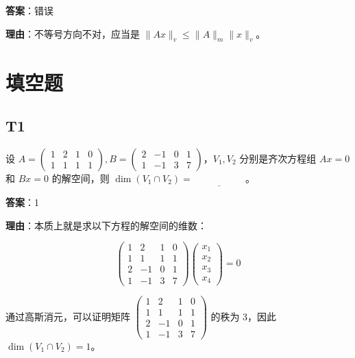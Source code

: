 \documentclass{article}
\begin{document}
\par \textbf{答案}：错误

\par \textbf{理由}：不等号方向不对，应当是 $\|Ax\|_v\leq \|A\|_m \|x\|_v$。

\section{填空题}

\subsection{T1}

\par 设 $A=\begin{pmatrix}
	1 & 2 & 1 & 0\\
	1 & 1 & 1 & 1
\end{pmatrix}, B = \begin{pmatrix}
	2 & -1 & 0 & 1\\
	1 & -1 & 3 & 7
\end{pmatrix}$，$V_1, V_2$ 分别是齐次方程组 $Ax=0$ 和 $Bx=0$ 的解空间，则 $\dim(V_1\cap V_2)=\underline{\phantom{empty\_space}}$。

\par \textbf{答案}：1

\par \textbf{理由}：本质上就是求以下方程的解空间的维数：

\begin{equation*}
	\begin{pmatrix}
		1 & 2 & 1 & 0\\
		1 & 1 & 1 & 1\\
		2 & -1 & 0 & 1\\
		1 & -1 & 3 & 7
	\end{pmatrix} \begin{pmatrix}
		x_1\\x_2\\x_3\\x_4
	\end{pmatrix}=0
\end{equation*}

\par 通过高斯消元，可以证明矩阵 $\begin{pmatrix}
	1 & 2 & 1 & 0\\
	1 & 1 & 1 & 1\\
	2 & -1 & 0 & 1\\
	1 & -1 & 3 & 7
\end{pmatrix}$ 的秩为 3，因此 $\dim(V_1\cap V_2)=1$。
\end{document}
